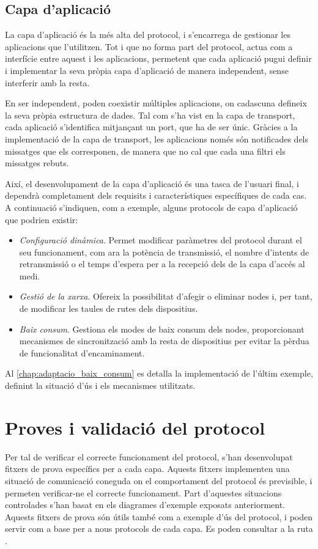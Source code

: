 \documentclass{tfgitic}[2024/07/01]
\begin{document}
{\subsection{Capa d'aplicació}
La capa d'aplicació és la més alta del protocol, i s'encarrega de gestionar les aplicacions que l'utilitzen. Tot i que no forma part del protocol, actua com a interfície entre aquest i les aplicacions, permetent que cada aplicació pugui definir i implementar la seva pròpia capa d'aplicació de manera independent, sense interferir amb la resta. 

En ser independent, poden coexistir múltiples aplicacions, on cadascuna defineix la seva pròpia estructura de dades. Tal com s'ha vist en la capa de transport, cada aplicació s'identifica mitjançant un port, que ha de ser únic. Gràcies a la implementació de la capa de transport, les aplicacions només són notificades dels missatges que els corresponen, de manera que no cal que cada una filtri els missatges rebuts.

Així, el desenvolupament de la capa d'aplicació és una tasca de l'usuari final, i dependrà completament dels requisits i característiques específiques de cada cas. A continuació s'indiquen, com a exemple, alguns protocols de capa d'aplicació que podrien existir:
\begin{itemize}
    \item \emph{Configuració dinàmica}. Permet modificar paràmetres del protocol durant el seu funcionament, com ara la potència de transmissió, el nombre d'intents de retransmissió o el temps d'espera per a la recepció dels  de la capa d'accés al medi.
    \item \emph{Gestió de la xarxa}. Ofereix la possibilitat d'afegir o eliminar nodes i, per tant, de modificar les taules de rutes dels dispositius.
    \item \emph{Baix consum}. Gestiona els modes de baix consum dels nodes, proporcionant mecanismes de sincronització amb la resta de dispositius per evitar la pèrdua de funcionalitat d'encaminament.
\end{itemize}

Al \autoref{chap:adaptacio_baix_consum} es detalla la implementació de l'últim exemple, definint la situació d'ús i els mecanismes utilitzats.

\section{Proves i validació del protocol}
Per tal de verificar el correcte funcionament del protocol, s'han desenvolupat fitxers de prova específics per a cada capa. Aquests fitxers implementen una situació de comunicació coneguda on el comportament del protocol és previsible, i permeten verificar-ne el correcte funcionament. Part d'aquestes situacions controlades s'han basat en els diagrames d'exemple exposats anteriorment. Aquests fitxers de prova són útils també com a exemple d'ús del protocol, i poden servir com a base per a nous protocols de cada capa. Es poden consultar a la ruta .

}
\end{document}
